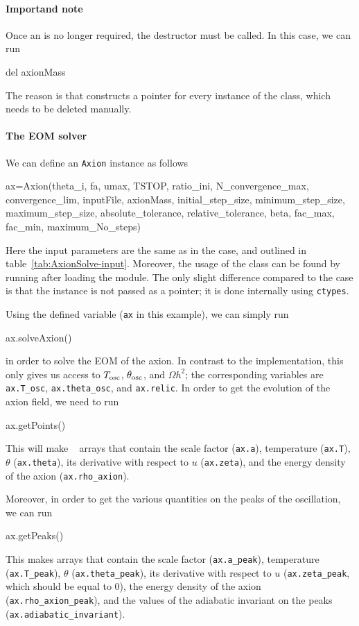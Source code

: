 \documentclass[11pt,a4paper]{article}
\begin{document}
\paragraph{Importand note} Once an  is no longer required, the destructor must be called. In this case, we can run
%
\begin{py}
	del axionMass
\end{py}
%
The reason is that \mimes constructs a pointer for every instance of the class, which needs to be deleted manually.  

\paragraph{The EOM solver}
%
We can define an {\tt Axion} instance as follows 
%
\begin{py}
	ax=Axion(theta_i, fa, umax, TSTOP, ratio_ini, N_convergence_max, convergence_lim, 
		inputFile, axionMass, initial_step_size, minimum_step_size, maximum_step_size, 
		absolute_tolerance, relative_tolerance, beta, fac_max, fac_min, maximum_No_steps)
\end{py}
%
Here the input parameters are the same as in the \CPP case, and outlined in table~\ref{tab:AxionSolve-input}. Moreover, the usage of the class can be found by running  after loading the module. The only slight difference compared to the \CPP case is that the  instance is not passed as a pointer; it is done internally using {\tt ctypes}. 


Using the defined variable ({\tt ax} in this example), we can simply run  
%
\begin{py}
	ax.solveAxion()
\end{py}
%
in order to solve the EOM of the axion. In contrast to the \CPP implementation, this only gives us access to $T_{\rm osc}{}$, $\theta_{\rm osc}{}$, and $\Omega h^2$; the corresponding variables are {\tt ax.T\_osc}, {\tt ax.theta\_osc}, and {\tt ax.relic}. In order to get the evolution of the axion field, we need to run 
%
\begin{py}
	ax.getPoints()
\end{py}
%
This will make ~\cite{harris2020array} arrays that contain the scale factor ({\tt ax.a}), temperature ({\tt ax.T}), $\theta$ ({\tt ax.theta}), its derivative with respect to $u$ ({\tt ax.zeta}), and the energy density of the axion ({\tt ax.rho\_axion}).

Moreover, in order to get the various quantities on the peaks of the oscillation, we can run
%
\begin{py}
	ax.getPeaks()
\end{py}
%
This makes  arrays that contain the scale factor ({\tt ax.a\_peak}), temperature ({\tt ax.T\_peak}), $\theta$ ({\tt ax.theta\_peak}), its derivative with respect to $u$ ({\tt ax.zeta\_peak}, which should be equal to $0$), the energy density of the axion ({\tt ax.rho\_axion\_peak}), and the values of the adiabatic invariant on the peaks ({\tt ax.adiabatic\_invariant}).
\end{document}

